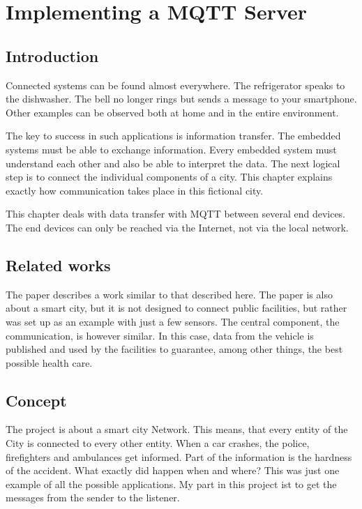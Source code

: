 \chapter{Implementing a MQTT Server}
\label{intro} 



\section{Introduction}
\label{sec:1}


Connected systems can be found almost everywhere. The refrigerator speaks to the dishwasher. The bell no longer rings but sends a message to your smartphone. Other examples can be observed both at home and in the entire environment.

The key to success in such applications is information transfer. The embedded systems must be able to exchange information. Every embedded system must understand each other and also be able to interpret the data. The next logical step is to connect the individual components of a city. This chapter explains exactly how communication takes place in this fictional city.

This chapter deals with data transfer with MQTT between several end devices. The end devices can only be reached via the Internet, not via the local network.


\section{Related works}
\label{sec:2}
The paper \cite{inbook} describes a work similar to that described here. The paper is also about a smart city, but it is not designed to connect public facilities, but rather was set up as an example with just a few sensors. The central component, the communication, is however similar. In this case, data from the vehicle is published and used by the facilities to guarantee, among other things, the best possible health care.

\section{Concept}
\label{sec:3}
The project is about a smart city Network. This means, that every entity of the City is connected to every other entity. When a car crashes, the police, firefighters and ambulances get informed. Part of the information is the hardness of the accident. What exactly did happen when and where? This was just one example of all the possible applications. My part in this project ist to get the messages from the sender to the listener.
\newline

